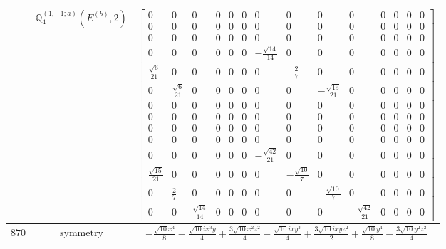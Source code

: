 \documentclass[fleqn,8pt,landscape]{jsarticle}
\begin{document}
\begin{longtable}{ccc}
$  $ & $ \mathbb{Q}_{4}^{(1,-1;a)}(E^{(b)},2) $ & $ \begin{bmatrix} 0 & 0 & 0 & 0 & 0 & 0 & 0 & 0 & 0 & 0 & 0 & 0 & 0 & 0 \\ 0 & 0 & 0 & 0 & 0 & 0 & 0 & 0 & 0 & 0 & 0 & 0 & 0 & 0 \\ 0 & 0 & 0 & 0 & 0 & 0 & 0 & 0 & 0 & 0 & 0 & 0 & 0 & 0 \\ 0 & 0 & 0 & 0 & 0 & 0 & - \frac{\sqrt{14}}{14} & 0 & 0 & 0 & 0 & 0 & 0 & 0 \\ \frac{\sqrt{6}}{21} & 0 & 0 & 0 & 0 & 0 & 0 & - \frac{2}{7} & 0 & 0 & 0 & 0 & 0 & 0 \\ 0 & \frac{\sqrt{6}}{21} & 0 & 0 & 0 & 0 & 0 & 0 & - \frac{\sqrt{15}}{21} & 0 & 0 & 0 & 0 & 0 \\ 0 & 0 & 0 & 0 & 0 & 0 & 0 & 0 & 0 & 0 & 0 & 0 & 0 & 0 \\ 0 & 0 & 0 & 0 & 0 & 0 & 0 & 0 & 0 & 0 & 0 & 0 & 0 & 0 \\ 0 & 0 & 0 & 0 & 0 & 0 & 0 & 0 & 0 & 0 & 0 & 0 & 0 & 0 \\ 0 & 0 & 0 & 0 & 0 & 0 & 0 & 0 & 0 & 0 & 0 & 0 & 0 & 0 \\ 0 & 0 & 0 & 0 & 0 & 0 & - \frac{\sqrt{42}}{21} & 0 & 0 & 0 & 0 & 0 & 0 & 0 \\ \frac{\sqrt{15}}{21} & 0 & 0 & 0 & 0 & 0 & 0 & - \frac{\sqrt{10}}{7} & 0 & 0 & 0 & 0 & 0 & 0 \\ 0 & \frac{2}{7} & 0 & 0 & 0 & 0 & 0 & 0 & - \frac{\sqrt{10}}{7} & 0 & 0 & 0 & 0 & 0 \\ 0 & 0 & \frac{\sqrt{14}}{14} & 0 & 0 & 0 & 0 & 0 & 0 & - \frac{\sqrt{42}}{21} & 0 & 0 & 0 & 0 \end{bmatrix} $ \\ \hline
$ 870 $ & $ \text{symmetry} $ & $ - \frac{\sqrt{10} x^{4}}{8} - \frac{\sqrt{10} i x^{3} y}{4} + \frac{3 \sqrt{10} x^{2} z^{2}}{4} - \frac{\sqrt{10} i x y^{3}}{4} + \frac{3 \sqrt{10} i x y z^{2}}{2} + \frac{\sqrt{10} y^{4}}{8} - \frac{3 \sqrt{10} y^{2} z^{2}}{4} $ \\

\end{longtable}
\end{document}
